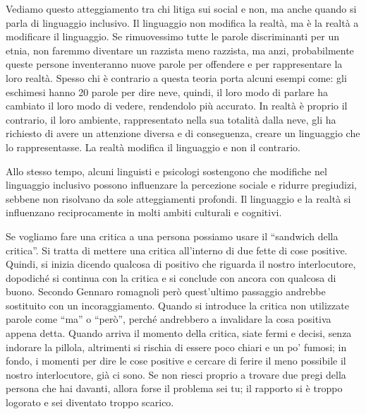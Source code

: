 \documentclass[12pt]{book} %
\begin{document}
Vediamo questo atteggiamento tra chi litiga sui social e non, ma anche quando si parla di linguaggio inclusivo. Il
linguaggio non modifica la realtà, ma è la realtà a modificare il linguaggio. Se rimuovessimo tutte le parole
discriminanti per un etnia, non faremmo diventare un razzista meno razzista, ma anzi, probabilmente queste persone
inventeranno nuove parole per offendere e per rappresentare la loro realtà.
Spesso chi è contrario a questa teoria porta alcuni esempi come: gli eschimesi hanno 20 parole per dire neve, quindi, il loro modo di parlare ha cambiato il loro modo di vedere, rendendolo più accurato. In realtà è proprio il contrario, il loro ambiente, rappresentato nella sua totalità dalla neve, gli ha richiesto di avere un attenzione diversa e di conseguenza, creare un linguaggio che lo rappresentasse. La realtà modifica il linguaggio e non il contrario.

Allo stesso tempo, alcuni linguisti e psicologi sostengono che modifiche nel linguaggio inclusivo possono influenzare la percezione sociale e ridurre pregiudizi, sebbene non risolvano da sole atteggiamenti profondi. Il linguaggio e la realtà si influenzano reciprocamente in molti ambiti culturali e cognitivi.

Se vogliamo fare una critica a una persona possiamo usare il “sandwich della critica”. Si tratta di mettere una critica
all'interno di due fette di cose positive. Quindi, si inizia dicendo qualcosa di positivo che
riguarda il nostro interlocutore, dopodiché si continua con la critica e si conclude con ancora con qualcosa di buono.
Secondo Gennaro romagnoli però quest'ultimo passaggio andrebbe sostituito con un incoraggiamento. 
Quando si introduce la critica non utilizzate parole come “ma” o “però”, perché andrebbero a invalidare la cosa
positiva appena detta. Quando arriva il momento della critica, siate fermi e decisi, senza indorare la pillola,
altrimenti si rischia di essere poco chiari e un po' fumosi; in fondo, i momenti per dire le cose
positive e cercare di ferire il meno possibile il nostro interlocutore, già ci sono. Se non riesci proprio a trovare
due pregi della persona che hai davanti, allora forse il problema sei tu; il rapporto si è troppo logorato e sei
diventato troppo scarico.
\end{document}
